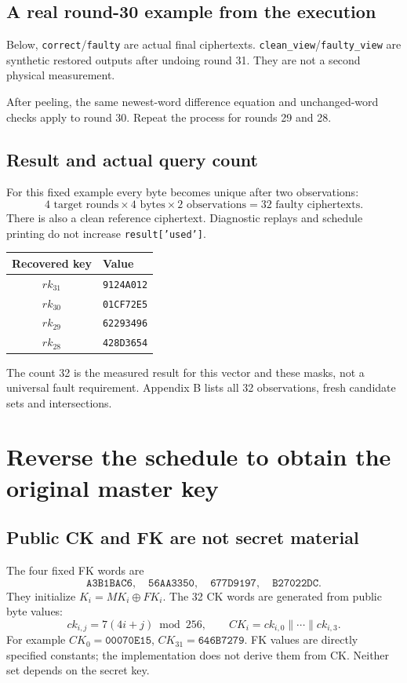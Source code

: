 \documentclass[11pt,a4paper]{report}
\newcommand{\hx}[1]{\texttt{#1}}
\newcommand{\xor}{\mathbin{\oplus}}
\begin{document}
\section{A real round-30 example from the execution}
Below, \texttt{correct}/\texttt{faulty} are actual final ciphertexts. \texttt{clean\_view}/\texttt{faulty\_view} are synthetic restored outputs after undoing round 31. They are not a second physical measurement.

After peeling, the same newest-word difference equation and unchanged-word checks apply to round 30. Repeat the process for rounds 29 and 28.

\section{Result and actual query count}
For this fixed example every byte becomes unique after two observations:
\[4\text{ target rounds}\times4\text{ bytes}\times2\text{ observations}=32\text{ faulty ciphertexts}.\]
There is also a clean reference ciphertext. Diagnostic replays and schedule printing do not increase \texttt{result['used']}.
\begin{center}\begin{tabular}{cl}\toprule Recovered key&Value\\\midrule
$rk_{31}$&\hx{9124A012}\\$rk_{30}$&\hx{01CF72E5}\\$rk_{29}$&\hx{62293496}\\$rk_{28}$&\hx{428D3654}\\\bottomrule\end{tabular}\end{center}
The count 32 is the measured result for this vector and these masks, not a universal fault requirement. Appendix B lists all 32 observations, fresh candidate sets and intersections.

\chapter{Reverse the schedule to obtain the original master key}
\section{Public CK and FK are not secret material}
The four fixed FK words are
\[\hx{A3B1BAC6},\quad\hx{56AA3350},\quad\hx{677D9197},\quad\hx{B27022DC}.\]
They initialize \(K_i=MK_i\xor FK_i\). The 32 CK words are generated from public byte values:
\[ck_{i,j}=7(4i+j)\bmod256,\qquad CK_i=ck_{i,0}\parallel\cdots\parallel ck_{i,3}.\]
For example \(CK_0=\hx{00070E15}\), \(CK_{31}=\hx{646B7279}\). FK values are directly specified constants; the implementation does not derive them from CK. Neither set depends on the secret key.
\end{document}
